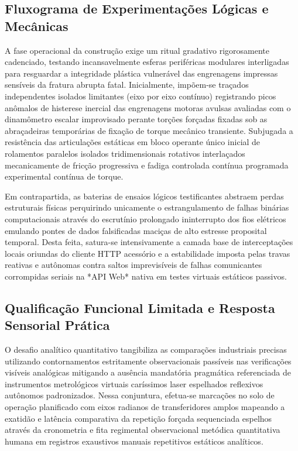 \subsection{Fluxograma de Experimentações Lógicas e Mecânicas}

A fase operacional da construção exige um ritual gradativo rigorosamente cadenciado, testando incansavelmente esferas periféricas modulares interligadas para resguardar a integridade plástica vulnerável das engrenagens impressas sensíveis da fratura abrupta fatal. Inicialmente, impõem-se traçados independentes isolados limitantes (eixo por eixo contínuo) registrando picos anômalos de histerese inercial das engrenagens motoras avulsas avaliadas com o dinamômetro escalar improvisado perante torções forçadas fixadas sob as abraçadeiras temporárias de fixação de torque mecânico transiente. Subjugada a resistência das articulações estáticas em bloco operante único inicial de rolamentos paralelos isolados tridimensionais rotativos interlaçados mecanicamente de fricção progressiva e fadiga controlada contínua programada experimental contínua de torque.

Em contrapartida, as baterias de ensaios lógicos testificantes abstraem perdas estruturais físicas perquirindo unicamente o estrangulamento de falhas binárias computacionais através do escrutínio prolongado ininterrupto dos fios elétricos emulando pontes de dados falsificadas maciças de alto estresse proposital temporal. Desta feita, satura-se intensivamente a camada base de interceptações locais oriundas do cliente HTTP acessório e a estabilidade imposta pelas travas reativas e autônomas contra saltos imprevisíveis de falhas comunicantes corrompidas seriais na *API Web* nativa em testes virtuais estáticos passivos.

\subsection{Qualificação Funcional Limitada e Resposta Sensorial Prática}

O desafio analítico quantitativo tangibiliza as comparações industriais precisas utilizando contornamentos estritamente observacionais passíveis nas verificações visíveis analógicas mitigando a ausência mandatória pragmática referenciada de instrumentos metrológicos virtuais caríssimos laser espelhados reflexivos autônomos padronizados. Nessa conjuntura, efetua-se marcações no solo de operação planificado com eixos radianos de transferidores amplos mapeando a exatidão e latência comparativa da repetição forçada sequenciada espelhos através da cronometria e fita regimental observacional metódica quantitativa humana em registros exaustivos manuais repetitivos estáticos analíticos.

